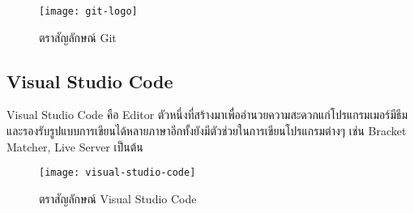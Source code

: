         \begin{figure}[H]
            \centering
            \texttt{[image: git-logo]}
            \caption{ตราสัญลักษณ์ Git}\label{git-logo}
        \end{figure}

    \subsection{Visual Studio Code}
        Visual Studio Code คือ Editor ตัวหนึ่งที่สร้างมาเพื่ออำนวยความสะดวกแก่โปรแกรมเมอร์มีธีมและรองรับรูปแบบการเขียนได้หลายภาษาอีกทั้งยังมีตัวช่วยในการเขียนโปรแกรมต่างๆ เช่น Bracket Matcher, Live Server เป็นต้น

        \begin{figure}[H]
            \centering
            \texttt{[image: visual-studio-code]}
            \caption{ตราสัญลักษณ์ Visual Studio Code}\label{visual-studio-code}
        \end{figure}


